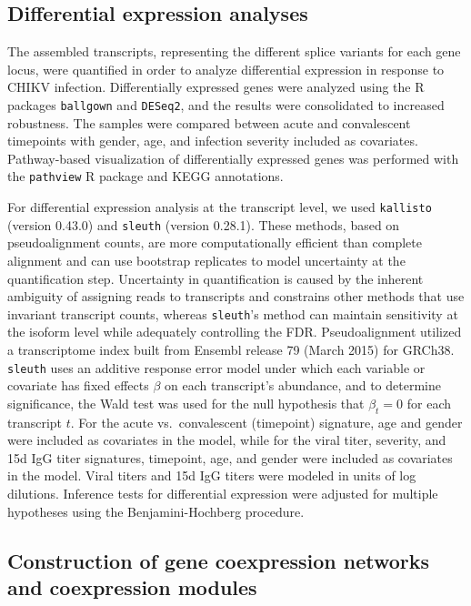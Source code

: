 \subsection{Differential expression analyses}

The assembled transcripts, representing the different splice variants for each gene locus, were quantified in order to analyze differential expression in response to CHIKV infection. Differentially expressed genes were analyzed using the R packages \texttt{ballgown}\autocite{Frazee2014,Pertea2016} and \texttt{DESeq2},\autocite{Anders2010} and the results were consolidated to increased robustness. The samples were compared between acute and convalescent timepoints with gender, age, and infection severity included as covariates. Pathway-based visualization of differentially expressed genes was performed with the \texttt{pathview}\autocite{Luo2013} R package and KEGG\autocite{Ogata1999} annotations.

For differential expression analysis at the transcript level, we used \texttt{kallisto}\autocite{Bray2016} (version 0.43.0) and \texttt{sleuth}\autocite{Pimentel2016} (version 0.28.1). These methods, based on pseudoalignment counts, are more computationally efficient than complete alignment and can use bootstrap replicates to model uncertainty at the quantification step.\autocite{Bray2016} Uncertainty in quantification is caused by the inherent ambiguity of assigning reads to transcripts and constrains other methods that use invariant transcript counts, whereas \texttt{sleuth}’s method can maintain sensitivity at the isoform level while adequately controlling the FDR.\autocite{Pimentel2016} Pseudoalignment utilized a transcriptome index built from Ensembl release 79 (March 2015) for GRCh38. \texttt{sleuth} uses an additive response error model under which each variable or covariate has fixed effects $\beta$ on each transcript’s abundance, and to determine significance, the Wald test was used for the null hypothesis that $\beta_t = 0$ for each transcript $t$. For the acute vs.\ convalescent (timepoint) signature, age and gender were included as covariates in the model, while for the viral titer, severity, and 15d IgG titer signatures, timepoint, age, and gender were included as covariates in the model. Viral titers and 15d IgG titers were modeled in units of log dilutions. Inference tests for differential expression were adjusted for multiple hypotheses using the Benjamini-Hochberg procedure.\autocite{Benjamini2001}

\subsection{Construction of gene coexpression networks and coexpression modules}

